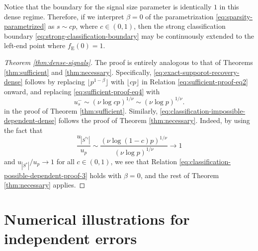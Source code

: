 \begin{remark}
Notice that the boundary for the signal size parameter is identically $1$ in this dense regime.
Therefore, if we interpret $\beta = 0$ of the parametrization \eqref{eq:sparsity-parametrized} as $s\sim cp$, where $c\in(0,1)$, then the strong classification boundary \eqref{eq:strong-classification-boundary} may be continuously extended to the left-end point where $f_{\mathrm{E}}(0)=1$.
\end{remark}

\begin{proof}[Theorem \ref{thm:dense-signals}]
The proof is entirely analogous to that of Theorems \ref{thm:sufficient} and \ref{thm:necessary}.
Specifically, \eqref{eq:exact-supporot-recovery-dense} follows by replacing $\lfloor p^{1-\beta} \rfloor$ with $\lfloor cp \rfloor$ in Relation \eqref{eq:sufficient-proof-eq2} onward, and replacing \eqref{eq:sufficient-proof-eq4} with
$$
u_s^- \sim (\nu\log{cp})^{1/\nu} \sim (\nu\log{p})^{1/\nu}.
$$
in the proof of Theorem \ref{thm:sufficient}.
Similarly, \eqref{eq:classification-impossible-dependent-dense} follows the proof of Theorem \ref{thm:necessary}. 
Indeed, by using the fact that
$$
\frac{u_{|S^{*c}|}}{u_p} \sim \frac{(\nu\log{(1-c)p})^{1/\nu}}{(\nu\log{p})^{1/\nu}} \to 1
$$
and ${u_{|S^*|}}/{u_p}\to 1$ for all $c\in(0,1)$, we see that Relation \eqref{eq:classification-possible-dependent-proof-3} holds with $\beta=0$, and the rest of Theorem \ref{thm:necessary} applies.
\end{proof}


\section{Numerical illustrations for independent errors}
\label{suppsec:numerical}

